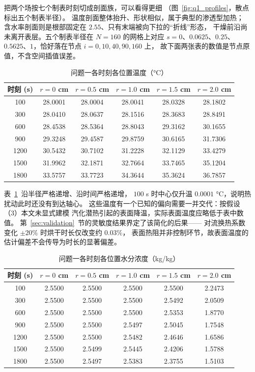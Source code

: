 把两个场按七个制表时刻切成剖面族，可以看得更细
（图~\ref{fig:q1_profiles}，散点标出五个制表半径）。
温度剖面整体抬升、形状相似，属于典型的渗透型加热；
含水率剖面则是根部固定在 $2.55$、只有末端被向下拉的“折线”形态，
干燥前沿尚未离开表层。五个制表半径在 $N=160$ 的网格上对应
$s=0$、$0.0625$、$0.25$、$0.5625$、$1$，恰好落在节点 $i=0,10,40,90,160$ 上，
故下面两张表的数值是节点原值，不含空间插值误差。
\fi

\begin{table}[H]
  \centering
  \caption{问题一各时刻各位置温度（°C）}
  \label{tab:q1_T}
  \begin{tabular}{cccccc}
  \toprule
  时刻 (s) & $r=0$ cm & $r=0.5$ cm & $r=1.0$ cm & $r=1.5$ cm & $r=2.0$ cm \\
  \midrule
  100  & 28.0001 & 28.0004 & 28.0041 & 28.0328 & 28.1802 \\
  300  & 28.0410 & 28.0637 & 28.1516 & 28.3683 & 28.8491 \\
  600  & 28.4538 & 28.5364 & 28.8043 & 29.3162 & 30.1655 \\
  900  & 29.3248 & 29.4587 & 29.8759 & 30.6165 & 31.7306 \\
  1200 & 30.5432 & 30.7102 & 31.2228 & 32.1129 & 33.4279 \\
  1500 & 31.9962 & 32.1871 & 32.7664 & 33.7465 & 35.1204 \\
  1800 & 33.5757 & 33.7723 & 34.3644 & 35.3624 & 36.7857 \\
  \bottomrule
  \end{tabular}
\end{table}

表~\ref{tab:q1_T}~沿半径严格递增、沿时间严格递增，
$100$ s 时中心仅升温 $0.0001$ °C，说明热扰动此时还没有到达轴心。
这些温度有一个已知的偏向需要一并交代：按假设（3）本文未显式建模
汽化潜热引起的表面降温，实际表面温度应略低于表中数值。
第~\ref{sec:validation}~节的灵敏度结果界定了该简化的后果——
对流换热系数变化 $\pm20\%$ 时烘干时长仅改变约 $0.03\%$，
表面热阻并非控制环节，故表面温度的估计偏差不会传导为时长的显著偏差。

\begin{table}[H]
  \centering
  \caption{问题一各时刻各位置水分浓度（kg/kg）}
  \label{tab:q1_C}
  \begin{tabular}{cccccc}
  \toprule
  时刻 (s) & $r=0$ cm & $r=0.5$ cm & $r=1.0$ cm & $r=1.5$ cm & $r=2.0$ cm \\
  \midrule
  100  & 2.5500 & 2.5500 & 2.5500 & 2.5500 & 2.2473 \\
  300  & 2.5500 & 2.5500 & 2.5500 & 2.5492 & 2.0509 \\
  600  & 2.5500 & 2.5500 & 2.5500 & 2.5353 & 1.8770 \\
  900  & 2.5500 & 2.5500 & 2.5497 & 2.5045 & 1.7548 \\
  1200 & 2.5500 & 2.5500 & 2.5482 & 2.4646 & 1.6586 \\
  1500 & 2.5500 & 2.5499 & 2.5445 & 2.4206 & 1.5788 \\
  1800 & 2.5500 & 2.5497 & 2.5383 & 2.3755 & 1.5103 \\
  \bottomrule
  \end{tabular}
\end{table}

